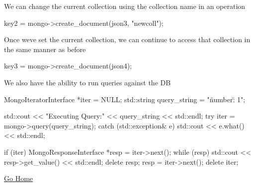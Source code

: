 We can change the current collection using the collection name in an operation \begin{DoxyVerb}key2 = mongo->create_document(json3, "newcoll");
\end{DoxyVerb}


Once we\textquotesingle{}ve set the current collection, we can continue to access that collection in the same manner as before \begin{DoxyVerb}key3 = mongo->create_document(json4);
\end{DoxyVerb}


We also have the ability to run queries against the DB \begin{DoxyVerb}MongoIteratorInterface *iter = NULL;
std::string query_string = "{\"number\": 1}";

std::cout << "Executing Query:" << query_string << std::endl;
try {
  iter = mongo->query(query_string);
}
catch (std::exception& e) {
  std::cout << e.what() << std::endl;
}

if (iter) {
  MongoResponseInterface *resp = iter->next();
  while (resp) {
    std::cout << resp->get_value() << std::endl;
    delete resp;
    resp = iter->next();
  }
  delete iter;
}
\end{DoxyVerb}


\hyperlink{index}{Go Home} 